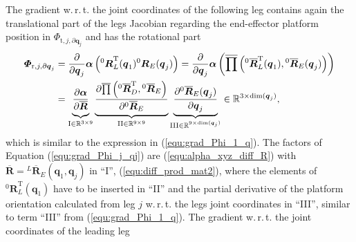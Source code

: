 \documentclass[robotics,article,accept,moreauthors,pdftex]{Definitions/mdpi}
\newcommand{\bm}[1]{\boldsymbol{#1}}
\newcommand{\rotmat}[2]{{{ }^{#1}\boldsymbol{R}}_{#2}}
\newcommand{\rotmato}[2]{{{ }^{#1}\boldsymbol{\overline{R}}}_{#2}}
\newcommand{\transp}[0]{{\mathrm{T}}}
\let\Phi\varPhi
\begin{document}
The gradient w.\,r.\,t. the joint coordinates of the following leg contains again the translational part of the legs Jacobian regarding the end-effector platform position in $\bm{\Phi}_{\mathrm{t},j,\partial\bm{q}_j}$ and has the rotational part
%
\begin{align}
\bm{\Phi}_{\mathrm{r},j,\partial\bm{q}_j}
&=
\frac{\partial}{\partial \bm{q}_j} \bm{\alpha}\left(\rotmat{0}{L}^\transp(\bm{q}_1) \rotmat{0}{E}(\bm{q}_j)\right)
=
\frac{\partial}{\partial \bm{q}_j} \bm{\alpha}\left(\overline{\prod}\left( \rotmato{0}{L}^\transp(\bm{q}_1), \rotmato{0}{E}(\bm{q}_j)\right)\right) \label{equ:grad_Phi_j_qj}\\
&=
\underbrace{
	\vphantom{\frac{\partial \rotmato{0}{E}(\bm{q}_j)}{\partial \bm{q}_j}}
	\frac{\partial \bm{\alpha}}{\partial \overline{\bm{R}}}
	}_{\mathrm{I} \in {\mathbb{R}}^{3 \times 9}}
\underbrace{
	\vphantom{\frac{\partial \rotmato{0}{E}(\bm{q}_j)}{\partial \bm{q}_j}}
	\frac{\partial \overline{\prod}\left(\rotmato{0}{D}^\transp, \rotmato{0}{E}\right)}{\partial \rotmato{0}{E}}
	}_{\mathrm{II} \in {\mathbb{R}}^{9 \times 9}}
\underbrace{
	\frac{\partial \rotmato{0}{E}(\bm{q}_j)}{\partial \bm{q}_j}
	}_{\mathrm{III} \in {\mathbb{R}}^{9 \times \mathrm{dim}(\bm{q}_j)}}
\in {\mathbb{R}}^{3 \times \mathrm{dim}(\bm{q}_j)}, \nonumber
\end{align}
%
which is similar to the expression in (\ref{equ:grad_Phi_1_q}).
The factors of Equation (\ref{equ:grad_Phi_j_qj}) are
(\ref{equ:alpha_xyz_diff_R}) with $\overline{\bm{R}}=\rotmato{L}{E}(\bm{q}_1,\bm{q}_j)$ in ``I'',
(\ref{equ:diff_prod_mat2}), where the elements of $\rotmat{0}{L}^\transp(\bm{q}_1)$ have to be inserted in ``II'' and
the partial derivative of the platform orientation calculated from leg $j$ w.\,r.\,t. the legs joint coordinates in ``III'', similar to term ``III'' from (\ref{equ:grad_Phi_1_q}).
%
The gradient w.\,r.\,t. the joint coordinates of the leading leg
%
\end{document}
